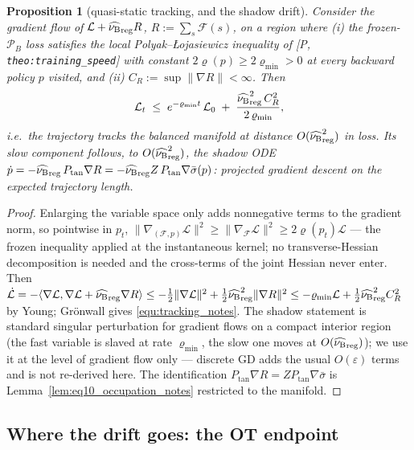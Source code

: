\documentclass[11pt]{article}
\newtheorem{proposition}[theorem]{Proposition}
\theoremstyle{definition}
\theoremstyle{remark}
\newcommand{\paperref}[1]{[P,\,\texttt{#1}]}   %
\begin{document}
\begin{proposition}[quasi-static tracking, and the shadow drift]\label{prop:two_timescale_notes}
Consider the gradient flow of $\mathcal L + \lamreg R$, $R := \sum_s
\mathcal F(s)$, on a region where (i) the frozen-$\mathcal P_B$ loss satisfies the local
Polyak--{\L}ojasiewicz inequality of \paperref{theo:training\_speed} with constant
$2\varrho(p)\geq2\varrho_{\min}>0$ at every backward policy $p$ visited, and (ii)
$C_R:=\sup\|\nabla R\|<\infty$. Then
\begin{equation}\label{equ:tracking_notes}
    \mathcal L_t \;\leq\; e^{-\varrho_{\min} t}\,\mathcal L_0
    \;+\; \frac{\lamreg^2\,C_R^2}{2\,\varrho_{\min}} ,
\end{equation}
i.e.\ the trajectory tracks the balanced manifold at distance $O(\lamreg^2)$
in loss. Its slow component follows, to $O(\lamreg^2)$, the shadow ODE
$\dot p = -\lamreg\,P_{\mathrm{tan}}\nabla R = -\lamreg Z\,
P_{\mathrm{tan}}\nabla\bar\sigma(p)$: projected gradient descent on the expected
trajectory length.
\end{proposition}

\begin{proof}
Enlarging the variable space only adds nonnegative terms to the gradient norm, so
pointwise in $p_t$, $\|\nabla_{(\mathcal F,p)}\mathcal L\|^2 \geq
\|\nabla_{\mathcal F}\mathcal L\|^2 \geq 2\varrho(p_t)\mathcal L$ --- the frozen
inequality applied at the instantaneous kernel; no transverse-Hessian decomposition is
needed and the cross-terms of the joint Hessian never enter. Then
$\dot{\mathcal L} = -\langle\nabla\mathcal L, \nabla\mathcal L +
\lamreg\nabla R\rangle \leq -\tfrac12\|\nabla\mathcal L\|^2 +
\tfrac12\lamreg^2\|\nabla R\|^2 \leq -\varrho_{\min}\mathcal L +
\tfrac12\lamreg^2C_R^2$ by Young; Gr\"onwall gives \eqref{equ:tracking_notes}.
The shadow statement is standard singular perturbation for gradient flows on a compact
interior region (the fast variable is slaved at rate $\varrho_{\min}$, the slow one moves
at $O(\lamreg)$); we use it at the level of gradient flow only ---
discrete GD adds the usual $O(\varepsilon)$ terms and is not re-derived here. The
identification $P_{\mathrm{tan}}\nabla R = Z P_{\mathrm{tan}}\nabla\bar\sigma$ is
Lemma~\ref{lem:eq10_occupation_notes} restricted to the manifold.
\end{proof}

\subsection{Where the drift goes: the OT endpoint}\label{sec:drift_target_notes}
\end{document}
